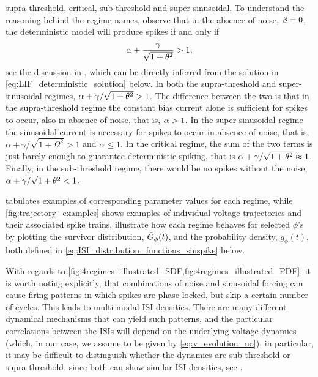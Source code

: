 supra-threshold, critical, sub-threshold and super-sinusoidal. 
To understand the reasoning behind the regime names, observe that in the absence
of noise, $\beta=0$, the deterministic model will produce spikes if and only if $$
\alpha + \frac{{\gamma }}{\sqrt{1 + { \theta}^2} } > 1, $$ see the discussion in
\cite{Burkitt2006b}, which can be directly inferred from the solution in
\cref{eq:LIF_deterministic_solution} below. In both the supra-threshold and
super-sinusoidal regimes, $ \alpha + {\gamma }/\sqrt{1 + { \theta}^2}  > 1$. The
difference between the two is that in the supra-threshold regime the constant
bias current alone is sufficient for spikes to occur, also in absence of noise,
that is,  $\alpha > 1$. In the super-sinusoidal regime the sinusoidal current is
necessary for spikes to occur in absence of noise, that is, $\alpha +
\gamma /
\sqrt{1+\Omega^2} > 1$ and $\alpha \leq 1$. In the critical regime, the sum of
the two terms is just barely enough to guarantee deterministic spiking, that is
$\alpha + {\gamma } / \sqrt{1 + { \theta}^2}  \approx 1$. Finally, in the sub-threshold regime,
there would be no spikes without the noise, $ \alpha + {\gamma } / \sqrt{1 + { \theta}^2} < 1$.

 tabulates examples of corresponding parameter values for each
regime, while \cref{fig:trajectory_examples} shows examples of individual
voltage trajectories and their associated spike trains.
 illustrate
 how each regime behaves for selected $\phi$'s by plotting the survivor
 distribution, ${ \bar{G} }_{\phi}(t)$, and the probability density, $g_{\phi}(t)$, both
 defined in \cref{eq:ISI_distribution_functions_sinspike} below.
 
With regards to
\cref{fig:4regimes_illustrated_SDF,fig:4regimes_illustrated_PDF}, it is worth
noting explicitly, that combinations of noise and sinusoidal forcing can cause
firing patterns in which spikes are phase locked, but skip a certain number of
cycles. This leads to multi-modal ISI densities. There are many different
dynamical mechanisms that can yield such patterns, and the particular
correlations between the ISIs will depend on the underlying voltage dynamics
(which, in our case, we assume to be given by \cref{eq:v_evolution_uo}); in
particular, it may be difficult to distinguish whether the dynamics are
sub-threshold or supra-threshold, since both can show similar ISI densities,
see \cite{Longtin1995}.


